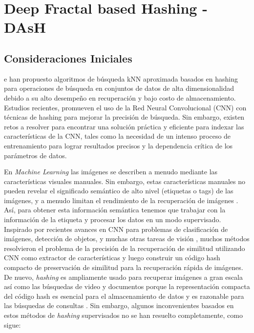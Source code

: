 \chapter{Deep Fractal based Hashing - DAsH}
 
 

\section{Consideraciones Iniciales}

e han propuesto   algoritmos de búsqueda  kNN aproximada basados en hashing para operaciones de búsqueda en conjuntos de datos de alta dimensionalidad debido a su alto desempeño  en  recuperación y bajo costo de almacenamiento. Estudios recientes, promueven el uso de la Red Neural Convolucional (CNN) con técnicas de hashing para mejorar la precisión de búsqueda. Sin embargo, existen retos a resolver para encontrar una solución práctica y eficiente para indexar las características de la CNN, tales como la necesidad de un intenso proceso de entrenamiento para lograr resultados precisos  y la dependencia crítica de los parámetros de datos. 


En \textit{Machine Learning} las imágenes se describen a menudo mediante las características visuales manuales.  Sin embargo, estas características manuales no pueden revelar el significado semántico de alto nivel (etiquetas o tags) de las imágenes, y a menudo limitan el rendimiento de la recuperación de imágenes \cite{Li:2015:RSS:2881665.2882186}. Así, para obtener esta información semántica tenemos que trabajar con la información de la etiqueta y procesar los datos en un modo supervisado. Inspirado por recientes avances en \acf{CNN} para problemas de clasificación de imágenes, detección de objetos, y muchas otras tareas de visión \cite{ImageNet,NIPS2013_5207,LiuWJJC12}, muchos métodos resolvieron el problema de la precisión de la recuperación de similitud utilizando CNN como extractor de características y luego construir un código hash compacto de preservación de similitud para la recuperación rápida de imágenes.   De nuevo, \textit{hashing} es ampliamente usado para recuperar imágenes a gran escala así como las búsquedas de video y documentos porque la representación compacta del código hash es esencial para el almacenamiento de datos y es razonable para las búsquedas de consultas \cite{conf/cvpr/ShenSLS15}.  Sin embargo, algunos inconvenientes basados en estos métodos de \textit{hashing} supervisados no se han resuelto completamente, como sigue:


